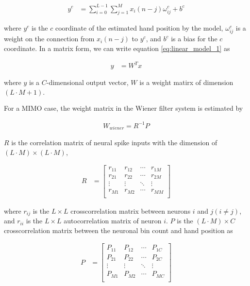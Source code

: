 \documentclass[8pt,a4paper]{article}
\begin{document}
\begin{multicols}{2}
\begin{align}
  \label{eq:linear_model_1}
  y^{c} &= \sum_{i=0}^{L-1} \sum_{j=1}^{M} x_{i}(n-j) \omega_{ij}^{c}+b^{c}
\end{align}

where $y^{c}$ is the $c$ coordinate of the estimated hand position by the model, $\omega_{ij}^{c}$ is a weight on the connection from $x_{i}(n-j)$ to $y^{c}$, 
and $b^{c}$ is a bias for the $c$ coordinate. In a matrix form, we can write equation \ref{eq:linear_model_1} as 

\begin{align}
  y&=W^{T} x
\end{align}

where $y$ is a $C$-dimensional output vector, $W$ is a weight matirx of dimension $(L \cdot M +1 )$.

For a MIMO case, the weight matrix in the Wiener filter system is estimated by 

\begin{align}
  W_{wiener}=R^{-1} P 
\end{align}

$R$ is the correlation matrix of neural spike inputs with the dimension of $(L \cdot M) \times (L \cdot M)$, 

\begin{align}
  R &= \left[ \begin{array}{cccc}
    r_{11} & r_{12} & \cdots & r_{1M} \\
    r_{21} & r_{22} & \cdots & r_{2M} \\ 
    \vdots & \vdots & \ddots & \vdots \\
    r_{M1} & r_{M2} & \cdots &  r_{MM} \\
    \end{array} 
    \right]
\end{align}

where $r_{ij}$ is the $L \times L$ crosscorrelation matrix between neurons $i$ and $j(i \neq j)$, and $r_{ii}$ is the $ L\times L$ autocorrelation matrix of neuron $i$. 
$P$ is the $(L \cdot M) \times C$ crosscorrelation matrix between the neuronal bin count and hand position as

\begin{align}
  P &= \left[ 
    \begin{array}{cccc}
      P_{11} & P_{12} & \cdots & P_{1C} \\
      P_{21} & P_{22} & \cdots & P_{2C} \\ 
      \vdots & \vdots & \ddots & \vdots \\
      P_{M1} & P_{M2} & \cdots & P_{MC} \\
    \end{array}
  \right]
\end{align}


\end{multicols}
\end{document}

